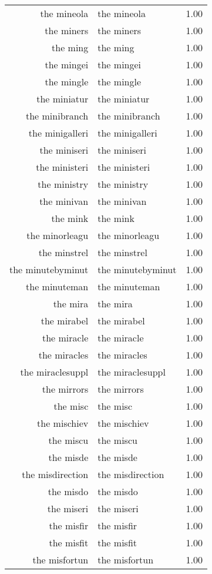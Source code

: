 \begin{table}[ht]
\begin{tabular}{rlr}
  the mineola & the mineola & 1.00 \\ 
  the miners & the miners & 1.00 \\ 
  the ming & the ming & 1.00 \\ 
  the mingei & the mingei & 1.00 \\ 
  the mingle & the mingle & 1.00 \\ 
  the miniatur & the miniatur & 1.00 \\ 
  the minibranch & the minibranch & 1.00 \\ 
  the minigalleri & the minigalleri & 1.00 \\ 
  the miniseri & the miniseri & 1.00 \\ 
  the ministeri & the ministeri & 1.00 \\ 
  the ministry & the ministry & 1.00 \\ 
  the minivan & the minivan & 1.00 \\ 
  the mink & the mink & 1.00 \\ 
  the minorleagu & the minorleagu & 1.00 \\ 
  the minstrel & the minstrel & 1.00 \\ 
  the minutebyminut & the minutebyminut & 1.00 \\ 
  the minuteman & the minuteman & 1.00 \\ 
  the mira & the mira & 1.00 \\ 
  the mirabel & the mirabel & 1.00 \\ 
  the miracle & the miracle & 1.00 \\ 
  the miracles & the miracles & 1.00 \\ 
  the miraclesuppl & the miraclesuppl & 1.00 \\ 
  the mirrors & the mirrors & 1.00 \\ 
  the misc & the misc & 1.00 \\ 
  the mischiev & the mischiev & 1.00 \\ 
  the miscu & the miscu & 1.00 \\ 
  the misde & the misde & 1.00 \\ 
  the misdirection & the misdirection & 1.00 \\ 
  the misdo & the misdo & 1.00 \\ 
  the miseri & the miseri & 1.00 \\ 
  the misfir & the misfir & 1.00 \\ 
  the misfit & the misfit & 1.00 \\ 
  the misfortun & the misfortun & 1.00 \\ 

\end{tabular}
\end{table}
